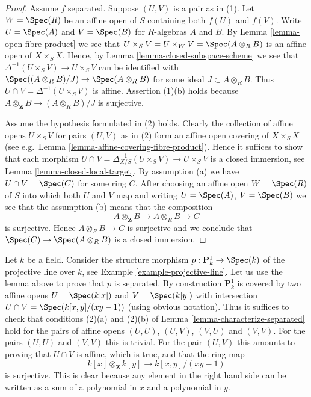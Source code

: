 \begin{proof}
Assume $f$ separated. Suppose $(U, V)$ is a pair as in (1).
Let $W = \Spec(R)$ be an affine open of $S$ containing
both $f(U)$ and $f(V)$. Write $U = \Spec(A)$ and
$V = \Spec(B)$ for $R$-algebras $A$ and $B$.
By Lemma \ref{lemma-open-fibre-product} we see that
$U \times_S V = U \times_W V = \Spec(A \otimes_R B)$
is an affine open of $X \times_S X$. Hence, by
Lemma \ref{lemma-closed-subspace-scheme} we see that
$\Delta^{-1}(U \times_S V) \to U \times_S V$
can be identified with $\Spec((A \otimes_R B)/J) \to \Spec(A \otimes_R B)$
for some ideal $J \subset A \otimes_R B$.
Thus $U \cap V = \Delta^{-1}(U \times_S V)$ is affine.
Assertion (1)(b) holds because
$A \otimes_{\mathbf{Z}} B \to (A \otimes_R B)/J$ is surjective.

\medskip\noindent
Assume the hypothesis formulated in (2) holds.
Clearly the collection of affine opens $U \times_S V$
for pairs $(U, V)$ as in (2) form an affine open covering
of $X \times_S X$ (see e.g.\ Lemma \ref{lemma-affine-covering-fibre-product}).
Hence it suffices to show that each morphism
$U \cap V = \Delta_{X/S}^{-1}(U \times_S V) \to U \times_S V$
is a closed immersion, see Lemma \ref{lemma-closed-local-target}.
By assumption (a) we have $U \cap V = \Spec(C)$ for some ring $C$.
After choosing an affine open $W = \Spec(R)$ of $S$
into which both $U$ and $V$ map and writing $U = \Spec(A)$,
$V = \Spec(B)$ we see that the assumption (b) means
that the composition
$$
A \otimes_{\mathbf{Z}} B \to A \otimes_R B \to C
$$
is surjective. Hence $A \otimes_R B \to C$ is surjective and
we conclude that $\Spec(C) \to \Spec(A \otimes_R B)$
is a closed immersion.
\end{proof}

\begin{example}
\label{example-projective-line-separated}
Let $k$ be a field. Consider the structure morphism
$p : \mathbf{P}^1_k \to \Spec(k)$ of the projective
line over $k$, see Example \ref{example-projective-line}.
Let us use the lemma above to prove that $p$
is separated. By construction $\mathbf{P}^1_k$ is covered by two
affine opens $U = \Spec(k[x])$ and $V = \Spec(k[y])$
with intersection $U \cap V = \Spec(k[x, y]/(xy - 1))$
(using obvious notation). Thus it suffices to check that
conditions (2)(a) and (2)(b) of Lemma \ref{lemma-characterize-separated}
hold for the pairs of affine opens $(U, U)$, $(U, V)$, $(V, U)$
and $(V, V)$. For the pairs $(U, U)$ and $(V, V)$ this is trivial.
For the pair $(U, V)$ this amounts to proving
that $U \cap V$ is affine, which is true, and that the ring map
$$
k[x] \otimes_{\mathbf{Z}} k[y] \longrightarrow k[x, y]/(xy - 1)
$$
is surjective. This is clear because any element in the
right hand side can be written as a sum of a polynomial
in $x$ and a polynomial in $y$.
\end{example}


